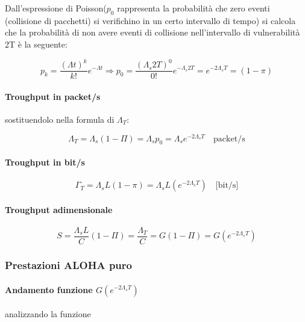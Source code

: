 Dall'espressione di Poisson($p_0$ rappresenta la probabilità che zero eventi (collisione di pacchetti) si verifichino in un certo intervallo di tempo) si calcola che la probabilità di non avere eventi di collisione nell'intervallo di vulnerabilità 2T è la seguente: 

\begin{equation}
p_k = \frac{(\Lambda t)^k}{k!} e^{-\Lambda t} \Rightarrow p_0 = \frac{(\Lambda_s 2T)^0}{0!} e^{-\Lambda_s 2T} = e^{-2\Lambda_s T} = (1 - \pi)
\end{equation}
\paragraph{Troughput in packet/s}
sostituendolo nella formula di $\Lambda_T$:

\begin{equation}
\Lambda_T = \Lambda_s (1 - \Pi) = \Lambda_s p_0 = \Lambda_s e^{-2 \Lambda_s T} \quad \text{packet/s}
\end{equation}

\paragraph{Troughput in bit/s}

\begin{equation}
    \Gamma_T = \Lambda_s L (1 - \pi) = \Lambda_s L (e^{-2\Lambda_s T}) \quad \text{[bit/s]}
\end{equation}

\paragraph{Troughput adimensionale}

\begin{equation}
    S = \frac{\Lambda_s L}{C}(1 - \Pi) = \frac{\Lambda_T}{C} = G(1 - \Pi) = G(e^{-2\Lambda_s T})
\end{equation}
\newpage

\subsubsection{Prestazioni ALOHA puro}

\paragraph{Andamento funzione $G(e^{-2\Lambda_s T})$} analizzando la funzione 

